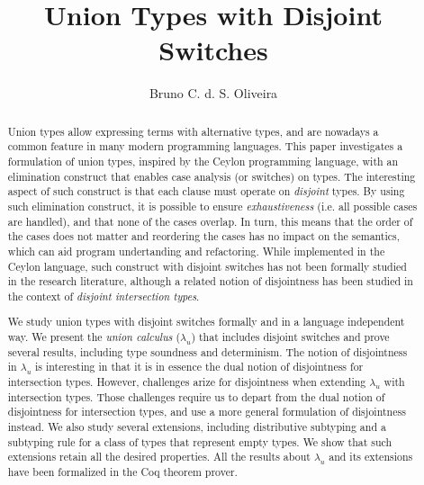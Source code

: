 \documentclass[acmsmall,review,anonymous,screen]{acmart}\settopmatter{printfolios=true,printccs=false,printacmref=false}
\title{Union Types with Disjoint Switches}
\author{Bruno C. d. S. Oliveira}
\affiliation{
  \institution{The University of Hong Kong}            %
}
\newcommand{\name}{$\lambda_{u}$\xspace}
\newcommand{\cal}{$\lambda_{u}$\xspace}
\begin{document}
\begin{abstract}
Union types allow expressing terms with alternative types,
and are nowadays a common feature in many modern programming
languages.
This paper investigates a formulation of union types,
inspired by the Ceylon programming language, with an elimination
construct that enables case analysis (or switches) on types.  The
interesting aspect of such construct is that each clause must operate
on \emph{disjoint} types. By using such elimination construct, it is
possible to ensure \emph{exhaustiveness} (i.e. all possible cases are
handled), and that none of the cases overlap. In turn, this means that
the order of the cases does not matter and reordering the cases has no
impact on the semantics, which can aid program undertanding and
refactoring. While implemented in the Ceylon language, such construct
with disjoint switches has not been formally studied in the research
literature, although a related notion of disjointness has been studied
in the context of \emph{disjoint intersection types}.

We study union types with disjoint switches formally and in a language
independent way.  We present the \emph{union calculus} (\cal) that
includes disjoint switches and prove several results, including type
soundness and determinism. The notion of disjointness in \cal
is interesting in that it is in essence the dual notion of disjointness
for intersection types.  However, challenges arize for
disjointness when extending \name with intersection types. Those challenges
require us to depart from the dual notion of disjointness for intersection types,
and use a more general formulation of disjointness instead. We also
study several extensions, including
distributive subtyping and a subtyping rule for a class of types that represent empty
types. We show that such extensions retain all the
desired properties. All the results about \cal and its extensions have
been formalized in the Coq theorem prover.
\end{abstract}

\begin{comment}
    With advance types
such as intersection types and union types, it has become a challenge
to define a robust, type-safe, coherent and deterministic type
system. One often has to compromise on one property to attain
another. Union types with pattern matching on types add significant
expressive power in programming language. Function overloading can
simply be expressed in a single function with the help of union types
and case analysis on types. Intersection types incorporate many
interesting and advance features that are not easy to implement in
classical OOP model.  This study proposes a novel calculus with all
aforementioned properties for pattern matching with union types and
intersection types. The calculus proposed in this study is named as
\cal.  Outline idea in \cal is to allow only non-overlapping or
disjoint types in case expressions.
\end{comment}
\end{document}
